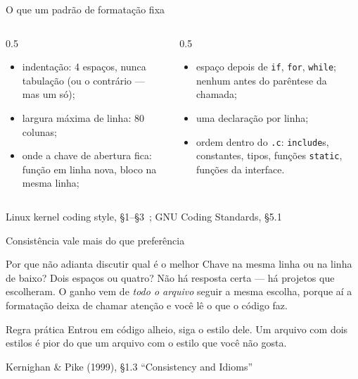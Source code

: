 \documentclass[aspectratio=169]{beamer}
\newcommand{\fonte}[1]{\vfill\hfill{\scriptsize\textcolor{UFSGray}{#1}}}
\begin{document}
\begin{frame}{O que um padrão de formatação fixa}
  \begin{columns}[T]
    \begin{column}{0.5\textwidth}
      \begin{itemize}
        \item indentação: 4 espaços, nunca tabulação (ou o contrário --- mas
          um só);
        \item largura máxima de linha: 80 colunas;
        \item onde a chave de abertura fica: função em linha nova, bloco na
          mesma linha;
      \end{itemize}
    \end{column}
    \begin{column}{0.5\textwidth}
      \begin{itemize}
        \item espaço depois de \texttt{if}, \texttt{for}, \texttt{while};
          nenhum antes do parêntese da chamada;
        \item uma declaração por linha;
        \item ordem dentro do \texttt{.c}: \texttt{include}s, constantes,
          tipos, funções \texttt{static}, funções da interface.
      \end{itemize}
    \end{column}
  \end{columns}
  \fonte{Linux kernel coding style, §1--§3~\cite{linux2024codingstyle}; GNU Coding Standards, §5.1~\cite{gnu2024standards}}
\end{frame}

\begin{frame}{Consistência vale mais do que preferência}
  \begin{block}{Por que não adianta discutir qual é o melhor}
    Chave na mesma linha ou na linha de baixo? Dois espaços ou quatro? Não
    há resposta certa --- há projetos que escolheram. O ganho vem de
    \emph{todo o arquivo} seguir a mesma escolha, porque aí a formatação
    deixa de chamar atenção e você lê o que o código faz.
  \end{block}
  \begin{exampleblock}{Regra prática}
    Entrou em código alheio, siga o estilo dele. Um arquivo com dois estilos
    é pior do que um arquivo com o estilo que você não gosta.
  \end{exampleblock}
  \fonte{Kernighan \& Pike (1999), §1.3 ``Consistency and Idioms''~\cite{kernighan1999practice}}
\end{frame}
\end{document}
